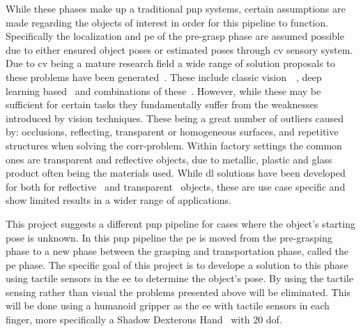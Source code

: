 While these phases make up a traditional \gls{pnp} systems, certain assumptions are made regarding the objects of interest in order for this pipeline to function. Specifically the localization and \gls{pe} of the pre-grasp phase are assumed possible due to either ensured object poses or estimated poses through \gls{cv} sensory system. Due to \gls{cv} being a mature research field a wide range of solution proposals to these problems have been generated~\cite{6d-pose-estimation-of-objects:-recent-technologies-and-challenges}. These include classic vision~\cite{3d-object-pose-estimation-using-stereo-vision-for-object-manipulation-system}~\cite{stereo-vision-based-automation-for-a-bin-picking-solution}, deep learning based~\cite{uncalibrated-stereo-vision-with-deep-learning-for-6-dof-pose-estimation-for-a-robot-arm-system} and combinations of these~\cite{stereo-vision-based-single-shot-6d-object-pose-estimation-for-bin-picking-by-a-robot-manipulator}. However, while these may be sufficient for certain tasks they fundamentally suffer from the weaknesses introduced by vision techniques. These being a great number of outliers caused by: occlusions, reflecting, transparent or homogeneous surfaces, and repetitive structures when solving the \gls{corr-problem}. Within factory settings the common ones are transparent and reflective objects, due to metallic, plastic and glass product often being the materials used. While \gls{dl} solutions have been developed for both for reflective~\cite{data-driven-object-pose-estimation-in-a-practical-bin-picking-application} and transparent~\cite{6dof-pose-estimation-of-transparent-object-from-a-single-rgb-d-image} objects, these are use case specific and show limited results in a wider range of applications. \medskip

This project suggests a different \gls{pnp} pipeline for cases where the object's starting pose is unknown. In this \gls{pnp} pipeline the \gls{pe} is moved from the pre-grasping phase to a new phase between the grasping and transportation phase, called the \gls{pe} phase. The specific goal of this project is to develope a solution to this phase using tactile sensors in the \gls{ee} to determine the object's pose. By using the tactile sensing rather than visual the problems presented above will be eliminated. This will be done using a humanoid gripper as the \gls{ee} with tactile sensors in each finger, more specifically a Shadow Dexterous Hand~\cite{shadow-dex-hand} with 20 \gls{dof}. \medskip

